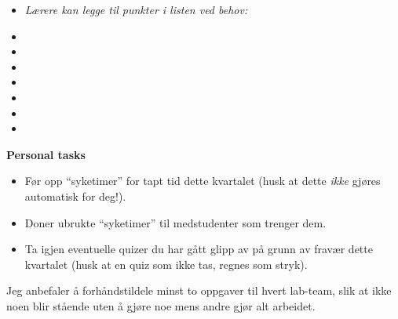 \filbreak

\begin{itemize}
\item{} {\it Lærere kan legge til punkter i listen ved behov:}
\vskip 10pt
\item{} \underbar{\hskip 50pt} 
\vskip 10pt
\item{} \underbar{\hskip 50pt} 
\vskip 10pt
\item{} \underbar{\hskip 50pt} 
\vskip 10pt
\item{} \underbar{\hskip 50pt} 
\vskip 10pt
\item{} \underbar{\hskip 50pt} 
\vskip 10pt
\item{} \underbar{\hskip 50pt} 
\vskip 10pt
\item{} \underbar{\hskip 50pt} 
\end{itemize}


\filbreak

\noindent
{\bf Personal tasks}

\begin{itemize}
\item{} Før opp ``syketimer'' for tapt tid dette kvartalet (husk at dette {\it ikke} gjøres automatisk for deg!).
\item{} Doner ubrukte ``syketimer'' til medstudenter som trenger dem.
\item{} Ta igjen eventuelle quizer du har gått glipp av på grunn av fravær dette kvartalet (husk at en quiz som ikke tas, regnes som stryk).
\end{itemize}







 






Jeg anbefaler å forhåndstildele minst to oppgaver til hvert lab-team, slik at ikke noen blir stående uten å gjøre noe mens andre gjør alt arbeidet.


